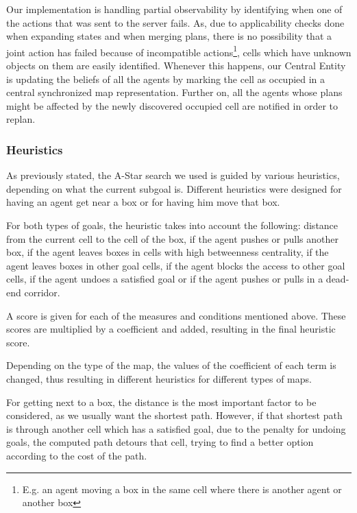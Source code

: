 Our implementation is handling partial observability by identifying when one of the actions that was sent to
the server fails. As, due to applicability checks done when expanding states and when merging plans, there is
no possibility that a joint action has failed because of incompatible actions\footnote{E.g. an agent moving a
box in the same cell where there is another agent or another box}, cells which have unknown objects on them
are easily identified. Whenever this happens, our Central Entity is updating the beliefs of all the agents by
marking the cell as occupied in a central synchronized map representation. Further on, all the agents whose
plans might be affected by the newly discovered occupied cell are notified in order to replan.

\subsubsection{Heuristics}
\label{sec:heuristics}

As previously stated, the A-Star search we used is guided by various heuristics, depending on what the current
subgoal is. Different heuristics were designed for having an agent get near a box or for having him move that
box.

For both types of goals, the heuristic takes into account the following: distance from the current cell to the
cell of the box, if the agent pushes or pulls another box, if the agent leaves boxes in cells with high
betweenness centrality, if the agent leaves boxes in other goal cells, if the agent blocks the access to other
goal cells, if the agent undoes a satisfied goal or if the agent pushes or pulls in a dead-end corridor.

A score is given for each of the measures and conditions mentioned above. These scores are multiplied by a
coefficient and added, resulting in the final heuristic score.

Depending on the type of the map, the values of the coefficient of each term is changed, thus resulting in
different heuristics for different types of maps.

For getting next to a box, the distance is the most important factor to be considered, as we usually want the
shortest path. However, if that shortest path is through another cell which has a satisfied goal, due to the
penalty for undoing goals, the computed path detours that cell, trying to find a better option according to
the cost of the path.

